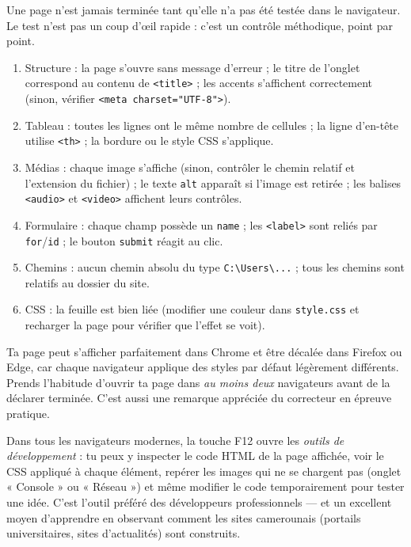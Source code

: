 \documentclass[11pt]{article}
\newcommand{\cle}[1]{{\popxbold\color{popdark}#1}}
\newcounter{popsec}
\newcounter{popsub}
\newcommand{\courssub}[1]{%
  \stepcounter{popsub}%
  \par\vspace{9pt}\noindent{\popxbold\fontsize{11.5}{13}\selectfont\color{popink}{\color{poporange}\thepopsec.\thepopsub}\hspace{6pt}#1}\par\nopagebreak\vspace{4pt}
}
\begin{document}
\courssub{Vérification et test de la page}

Une page n'est jamais terminée tant qu'elle n'a pas été testée dans le navigateur. Le test n'est pas un coup d'œil rapide : c'est un contrôle méthodique, point par point.

\begin{methode}
\begin{enumerate}
\item \cle{Structure} : la page s'ouvre sans message d'erreur ; le titre de l'onglet correspond au contenu de \texttt{<title>} ; les accents s'affichent correctement (sinon, vérifier \texttt{<meta charset="UTF-8">}).
\item \cle{Tableau} : toutes les lignes ont le même nombre de cellules ; la ligne d'en-tête utilise \texttt{<th>} ; la bordure ou le style CSS s'applique.
\item \cle{Médias} : chaque image s'affiche (sinon, contrôler le chemin relatif et l'extension du fichier) ; le texte \texttt{alt} apparaît si l'image est retirée ; les balises \texttt{<audio>} et \texttt{<video>} affichent leurs contrôles.
\item \cle{Formulaire} : chaque champ possède un \texttt{name} ; les \texttt{<label>} sont reliés par \texttt{for}/\texttt{id} ; le bouton \texttt{submit} réagit au clic.
\item \cle{Chemins} : aucun chemin absolu du type \texttt{C:\textbackslash Users\textbackslash ...} ; tous les chemins sont relatifs au dossier du site.
\item \cle{CSS} : la feuille est bien liée (modifier une couleur dans \texttt{style.css} et recharger la page pour vérifier que l'effet se voit).
\end{enumerate}
\end{methode}

\begin{attention}
Ta page peut s'afficher parfaitement dans Chrome et être décalée dans Firefox ou Edge, car chaque navigateur applique des styles par défaut légèrement différents. Prends l'habitude d'ouvrir ta page dans \emph{au moins deux} navigateurs avant de la déclarer terminée. C'est aussi une remarque appréciée du correcteur en épreuve pratique.
\end{attention}

\begin{savaistu}
Dans tous les navigateurs modernes, la touche \cle{F12} ouvre les \emph{outils de développement} : tu peux y inspecter le code HTML de la page affichée, voir le CSS appliqué à chaque élément, repérer les images qui ne se chargent pas (onglet « Console » ou « Réseau ») et même modifier le code temporairement pour tester une idée. C'est l'outil préféré des développeurs professionnels — et un excellent moyen d'apprendre en observant comment les sites camerounais (portails universitaires, sites d'actualités) sont construits.
\end{savaistu}
\end{document}

